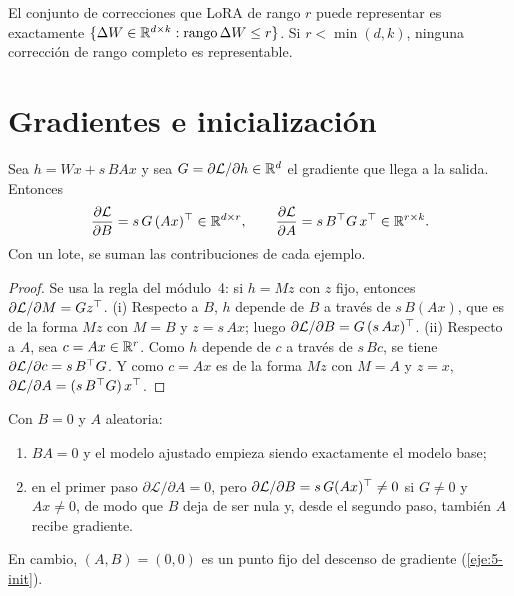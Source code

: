 \begin{corolario}\label{cor:representables}
El conjunto de correcciones que LoRA de rango $r$ puede representar es exactamente $\{\Delta W\in\mathbb{R}^{d\times k}:\operatorname{rango}\Delta W\le r\}$. Si $r<\min(d,k)$, ninguna corrección de rango completo es representable.
\end{corolario}

\section{Gradientes e inicialización}

\begin{proposicion}\label{prop:grad-lora}
Sea $h=Wx+s\,BAx$ y sea $G=\partial\mathcal{L}/\partial h\in\mathbb{R}^{d}$ el gradiente que llega a la salida. Entonces
\[
\frac{\partial\mathcal{L}}{\partial B}=s\,G\,(Ax)^{\top}\in\mathbb{R}^{d\times r},\qquad
\frac{\partial\mathcal{L}}{\partial A}=s\,B^{\top} G\,x^{\top}\in\mathbb{R}^{r\times k}.
\]
Con un lote, se suman las contribuciones de cada ejemplo.
\end{proposicion}

\begin{proof}
Se usa la regla del módulo~4: si $h=Mz$ con $z$ fijo, entonces $\partial\mathcal{L}/\partial M=Gz^{\top}$. (i) Respecto a $B$, $h$ depende de $B$ a través de $s\,B(Ax)$, que es de la forma $Mz$ con $M=B$ y $z=s\,Ax$; luego $\partial\mathcal{L}/\partial B=G\,(s\,Ax)^{\top}$. (ii) Respecto a $A$, sea $c=Ax\in\mathbb{R}^{r}$. Como $h$ depende de $c$ a través de $s\,Bc$, se tiene $\partial\mathcal{L}/\partial c=s\,B^{\top} G$. Y como $c=Ax$ es de la forma $Mz$ con $M=A$ y $z=x$, $\partial\mathcal{L}/\partial A=(s\,B^{\top} G)\,x^{\top}$.
\end{proof}

\begin{corolario}[Inicialización]\label{cor:init}
Con $B=0$ y $A$ aleatoria:
\begin{enumerate}
  \item $BA=0$ y el modelo ajustado empieza siendo exactamente el modelo base;
  \item en el primer paso $\partial\mathcal{L}/\partial A=0$, pero $\partial\mathcal{L}/\partial B=s\,G(Ax)^{\top}\ne 0$ si $G\ne 0$ y $Ax\ne 0$, de modo que $B$ deja de ser nula y, desde el segundo paso, también $A$ recibe gradiente.
\end{enumerate}
En cambio, $(A,B)=(0,0)$ es un punto fijo del descenso de gradiente (\cref{eje:5-init}).
\end{corolario}

